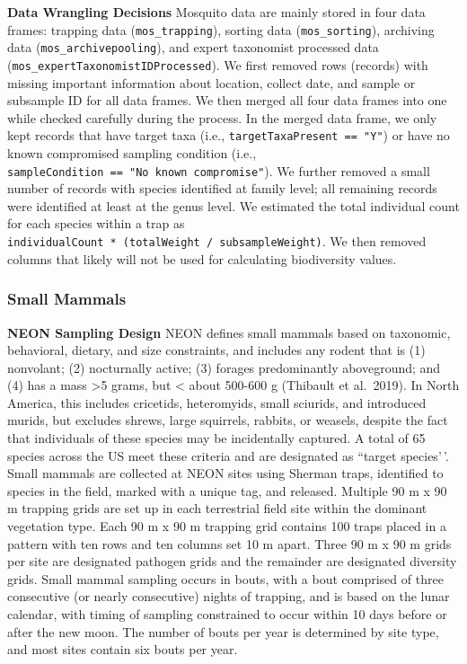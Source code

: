 \documentclass[
  12pt,
]{article}
\begin{document}
\textbf{Data Wrangling Decisions} Mosquito data are mainly stored in four data frames: trapping data (\texttt{mos\_trapping}), sorting data (\texttt{mos\_sorting}), archiving data (\texttt{mos\_archivepooling}), and expert taxonomist processed data (\texttt{mos\_expertTaxonomistIDProcessed}). We first removed rows (records) with missing important information about location, collect date, and sample or subsample ID for all data frames. We then merged all four data frames into one while checked carefully during the process. In the merged data frame, we only kept records that have target taxa (i.e., \texttt{targetTaxaPresent\ ==\ "Y"}) or have no known compromised sampling condition (i.e., \texttt{sampleCondition\ ==\ "No\ known\ compromise"}). We further removed a small number of records with species identified at family level; all remaining records were identified at least at the genus level. We estimated the total individual count for each species within a trap as \texttt{individualCount\ *\ (totalWeight\ /\ subsampleWeight)}. We then removed columns that likely will not be used for calculating biodiversity values.

\hypertarget{small-mammals}{%
\subsubsection{Small Mammals}\label{small-mammals}}

\textbf{NEON Sampling Design} NEON defines small mammals based on taxonomic, behavioral, dietary, and size constraints, and includes any rodent that is (1) nonvolant; (2) nocturnally active; (3) forages predominantly aboveground; and (4) has a mass \textgreater5 grams, but \textless{} about 500-600 g (Thibault et al.~2019). In North America, this includes cricetids, heteromyids, small sciurids, and introduced murids, but excludes shrews, large squirrels, rabbits, or weasels, despite the fact that individuals of these species may be incidentally captured. A total of 65 species across the US meet these criteria and are designated as ``target species'\,'. Small mammals are collected at NEON sites using Sherman traps, identified to species in the field, marked with a unique tag, and released. Multiple 90 m x 90 m trapping grids are set up in each terrestrial field site within the dominant vegetation type. Each 90 m x 90 m trapping grid contains 100 traps placed in a pattern with ten rows and ten columns set 10 m apart. Three 90 m x 90 m grids per site are designated pathogen grids and the remainder are designated diversity grids. Small mammal sampling occurs in bouts, with a bout comprised of three consecutive (or nearly consecutive) nights of trapping, and is based on the lunar calendar, with timing of sampling constrained to occur within 10 days before or after the new moon. The number of bouts per year is determined by site type, and most sites contain six bouts per year.
\end{document}
